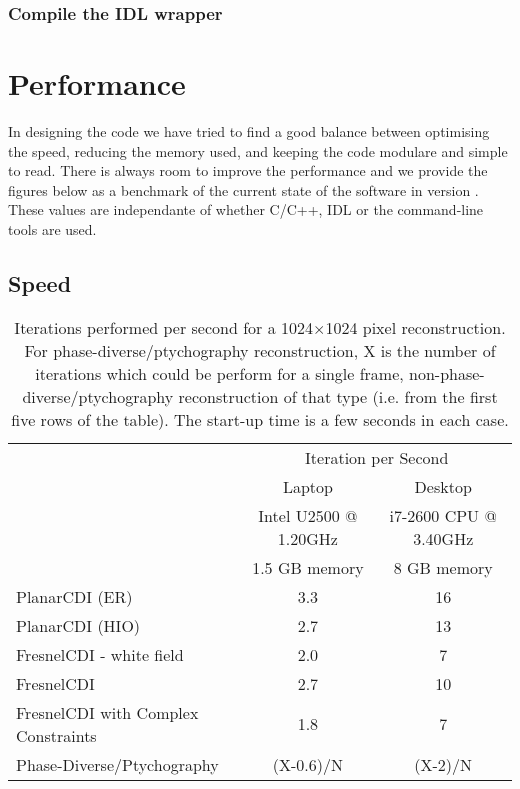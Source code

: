 \documentclass[]{nadia}
\begin{document}
\subsubsection{Compile the IDL wrapper}

\newpage

\section{Performance}

In designing the code we have tried to find a good balance between
optimising the speed, reducing the memory used, and keeping the code
modulare and simple to read. There is always room to improve the
performance and we provide the figures below as a benchmark of the
current state of the software in version \ver. These values are
independante of whether C/C++, IDL or the command-line tools are used.

\subsection{Speed}

\begin{table}[h!]
\begin{tabular}[h!]{lcc}
\toprule
   & \multicolumn{2}{c}{Iteration per Second} \\
   & Laptop & Desktop \\
   & Intel U2500 @ 1.20GHz & i7-2600 CPU @ 3.40GHz \\
   & 1.5 GB memory & 8 GB memory\\

\midrule
PlanarCDI (ER) & 3.3  &  16 \\
PlanarCDI (HIO) & 2.7 & 13 \\
FresnelCDI - white field & 2.0 & 7 \\
FresnelCDI & 2.7 & 10 \\
FresnelCDI with Complex Constraints & 1.8 & 7 \\
Phase-Diverse/Ptychography & (X-0.6)/N  & (X-2)/N  \\
\bottomrule
\end{tabular}

\caption{\label{table:speed} Iterations performed per second for a
  1024$\times$1024 pixel reconstruction. For
  phase-diverse/ptychography reconstruction, X is the number of
  iterations which could be perform for a single frame,
  non-phase-diverse/ptychography reconstruction of that type
  (i.e. from the first five rows of the table). The start-up time is a
  few seconds in each case. }
\end{table}
\end{document}
